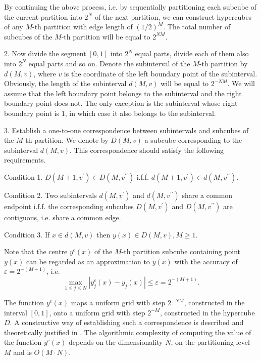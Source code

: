 \documentclass[entropy,article,submit,moreauthors,pdftex]{Definitions/mdpi}
\begin{document}
By continuing the above process, i.e. by sequentially partitioning each subcube of the current partition into $2^N$ of the next partition, we can construct hypercubes of any $M$-th partition with edge length of $(1/2)^M$. The total number of subcubes of the $M$-th partition will be equal to $2^{NM}$.

2. Now divide the segment $[0, 1]$ into $2^N$ equal parts, divide  each of them also into $2^N$ equal parts and so on. Denote the subinterval of the $M$-th partition by $d(M,v)$, where $v$ is the coordinate of the left boundary point of the subinterval. Obviously, the length of the subinterval $d(M,v)$ will be equal to $2^{-NM}$. We will assume that the left boundary point belongs to the subinterval and the right boundary point does not. The only exception is the subinterval whose right boundary point is $1$, in which case it also belongs to the subinterval.

3. Establish a one-to-one correspondence between subintervals and subcubes of the $M$-th partition. We denote by $D(M,v)$ a subcube corresponding to the subinterval $d(M,v)$. This correspondence should satisfy the following requirements.

Condition 1. $D(M+1,v^\prime) \in D(M,v^{\prime\prime})$ i.f.f. $d(M+1,v^\prime) \in d(M,v^{\prime\prime})$.

Condition 2. Two subintervals $d(M,v^\prime)$ and $d(M,v^{\prime\prime})$ share a common endpoint i.f.f. the corresponding subcubes $D(M,v^\prime)$ and $D(M,v^{\prime\prime})$  are  contiguous, i.e. share a common edge.

Condition 3.  If $x \in d(M,v)$ then $y(x) \in D(M,v), M \geq 1$.  

Note that the centre  $y^c(x)$ of the $M$-th partition subcube containing point $y(x)$ can be regarded as an approximation to $y(x)$ with the accuracy of $\varepsilon = 2^{-(M+1)}$, i.e.
\begin{equation}\label{prec}
\max_{1 \leq j \leq N} \left| y_j^c(x)-y_j(x) \right| \leq \varepsilon = 2^{-(M+1)}.
\end{equation} 

The function $y^c(x)$ maps a uniform grid with step $2^{-NM}$, constructed in the interval $[0,1]$, onto a uniform grid with step $2^{-M}$, constructed in the hypercube $D$. A constructive way of establishing such a correspondence is described and theoretically justified in \cite{Strongin2000, Sergeyev2013}. 
\textcolor[rgb]{1,0,0}{The algorithmic complexity of computing the value of the function $y^c(x)$ depends on the dimensionality $N$, on the partitioning level $M$ and is $O(M\cdot N)$.}
\end{document}

